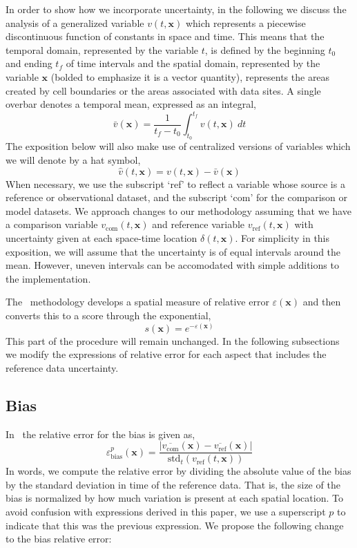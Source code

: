 \documentclass{agujournal}
\newcommand{\bx}{\mathbf{x}}
\begin{document}
In order to show how we incorporate uncertainty, in the following we discuss the analysis of a generalized variable $v(t,\bx)$ which represents a piecewise discontinuous function of constants in space and time. This means that the temporal domain, represented by the variable $t$, is defined by the beginning $t_0$ and ending $t_f$ of time intervals and the spatial domain, represented by the variable $\bx$ (bolded to emphasize it is a vector quantity), represents the areas created by cell boundaries or the areas associated with data sites. A single overbar denotes a temporal mean, expressed as an integral,
%
\begin{equation}
	\bar{v}(\bx) = \frac{1}{t_f-t_0} \int_{t_0}^{t_f} v(t,\bx)\ dt\label{e:mean}
\end{equation}
%
The exposition below will also make use of centralized versions of variables which we will denote by a hat symbol,
%
\begin{equation}
	\widehat{v}(t,\bx) = v(t,\bx)-\bar{v}(\bx)\label{e:center}
\end{equation}
%
When necessary, we use the subscript `ref' to reflect a variable whose source is a reference or observational dataset, and the subscript `com' for the comparison or model datasets. We approach changes to our methodology assuming that we have a comparison variable $v_{\mathrm{com}}(t,\bx)$ and reference variable $v_{\mathrm{ref}}(t,\bx)$ with uncertainty given at each space-time location $\delta(t,\bx)$. For simplicity in this exposition, we will assume that the uncertainty is of equal intervals around the mean. However, uneven intervals can be accomodated with simple additions to the implementation.

The \cite{Collier_JAMES_20181101}~methodology develops a spatial measure of relative error $\varepsilon(\bx)$ and then converts this to a score through the exponential,
%
\begin{equation}
	s(\bx) = e^{-\varepsilon(\bx)}\label{e:score}
\end{equation}
%
This part of the procedure will remain unchanged. In the following subsections we modify the expressions of relative error for each aspect that includes the reference data uncertainty.

\subsection{Bias}

In~\cite{Collier_JAMES_20181101} the relative error for the bias is given as,
%
\begin{equation}
	\varepsilon^{p}_{\mathrm{bias}}(\bx) = \frac{\left| \overline{v_{\mathrm{com}}}(\bx) -\overline{v_{\mathrm{ref}}}(\bx) \right|}{\mathrm{std}_t\left( v_{\mathrm{ref}}(t,\bx)\right)}\label{e:bias0}
\end{equation}
%
In words, we compute the relative error by dividing the absolute value of the bias by the standard deviation in time of the reference data. That is, the size of the bias is normalized by how much variation is present at each spatial location. To avoid confusion with expressions derived in this paper, we use a superscript $p$ to indicate that this was the previous expression. We propose the following change to the bias relative error:
\end{document}
